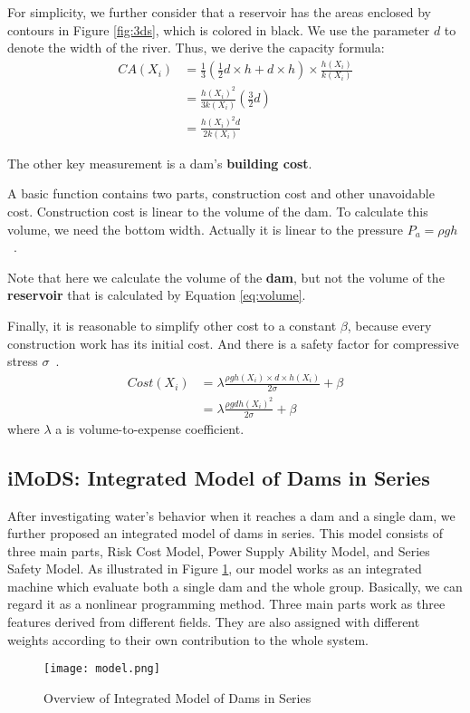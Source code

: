 \documentclass{mcmthesis}
\begin{document}
For simplicity, we further consider that a reservoir has the areas enclosed by contours in Figure \ref{fig:3ds}, which is colored in black. We use the parameter $d$ to denote the width of the river. Thus, we derive the capacity formula:
\begin{align}
\label{eq:volume}
CA(X_i) &= \frac{1}{3}(\frac{1}{2}d\times h + d\times h)\times \frac{h(X_i)}{k(X_i)}\nonumber\\
	&= \frac{h(X_i)^2}{3k(X_i)}(\frac{3}{2}d)\nonumber\\
	&= \frac{h(X_i)^2d}{2k(X_i)}
\end{align}

The other key measurement is a dam's \textbf{building cost}.

A basic function contains two parts, construction cost and other unavoidable cost. Construction cost is linear to the volume of the dam. To calculate this volume, we need the bottom width. Actually it is linear to the pressure $P_a = \rho gh$~\cite{Finite}.

Note that here we calculate the volume of the \textbf{dam}, but not the volume of the \textbf{reservoir} that is calculated by Equation \eqref{eq:volume}.

Finally, it is reasonable to simplify other cost to a constant $\beta$, because every construction work has its initial cost. And there is a safety factor for compressive stress $\sigma$~\cite{Finite}.
\begin{align}
\label{eq:Cost}
Cost(X_i) &= \lambda \frac{\rho g h(X_i) \times d \times h(X_i)}{2\sigma} + \beta\nonumber\\
	&= \lambda \frac{\rho g d h(X_i)^2}{2\sigma}+\beta
\end{align}
where $\lambda$ a is volume-to-expense coefficient.
\subsection{iMoDS: Integrated Model of Dams in Series}
After investigating water's behavior when it reaches a dam and a single dam, we further proposed an integrated model of dams in series. This model consists of three main parts, Risk Cost Model, Power Supply Ability Model, and Series Safety Model. As illustrated in Figure \ref{fig:model}, our model works as an integrated machine which evaluate both a single dam and the whole group. Basically, we can regard it as a nonlinear programming method. Three main parts work as three features derived from different fields. They are also assigned with different weights according to their own contribution to the whole system.
\begin{figure}
    \centering
    \texttt{[image: model.png]}
    \caption{Overview of Integrated Model of Dams in Series}
    \label{fig:model}
\end{figure}
\end{document}

